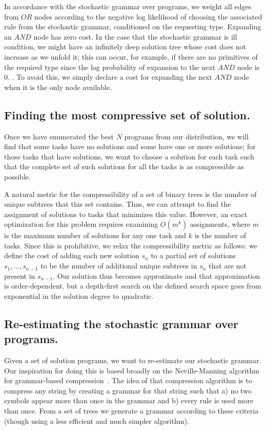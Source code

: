 \documentclass{article}
\begin{document}
In accordance with the stochastic grammar over programs, we weight all
edges from $OR$ nodes according to the negative log likelihood of
choosing the associated rule from the stochastic grammar, conditioned
on the requesting type. Expanding an $AND$ node has zero cost. In the
case that the stochastic grammar is ill condition, we might have an
infinitely deep solution tree whose cost does not increase as we
unfold it; this can occur, for example, if there are no primitives of
the required type since the log probability of expansion to the next
$AND$ node is 0. . To avoid this, we simply declare a cost for
expanding the next $AND$ node when it is the only node available.

\subsection{Finding the most compressive set of solution.}

Once we have enumerated the best $N$ programs from our distribution,
we will find that some tasks have no solutions and some have one or
more solutions; for those tasks that have solutions, we want to choose
a solution for each task such that the complete set of such solutions
for all the tasks is as compressible as possible.

A natural metric for the compressibility of a set of binary trees is
the number of unique subtrees that this set contains. Thus, we can
attempt to find the assignment of solutions to tasks that minimizes
this value. However, an exact optimization for this problem requires
examining $O(m^k)$ assignments, where $m$ is the maximum number of
solutions for any one task and $k$ is the number of tasks. Since this
is prohibitive, we relax the compressibility metric as follows: we
define the cost of adding each new solution $s_n$ to a partial set of
solutions $s_1, \dots, s_{n-1}$ to be the number of additional unique
subtrees in $s_n$ that are not present in $s_{n-1}$. Our solution thus
becomes approximate and that approximation is order-dependent, but a
depth-first search on the defined search space goes from exponential
in the solution degree to quadratic.

\subsection{Re-estimating the stochastic grammar over programs.}

Given a set of solution programs, we want to re-estimate our
stochastic grammar. Our inspiration for doing this is based broadly on
the Neville-Manning algorithm for grammar-based
compression~\cite{nevill1997identifying}. The idea of that compression
algorithm is to compress any string by creating a grammar for that
string such that a) no two symbols appear more than once in the
grammar and b) every rule is used more than once. From a set of trees
we generate a grammar according to these criteria (though using a less
efficient and much simpler algorithm). 
\end{document}
